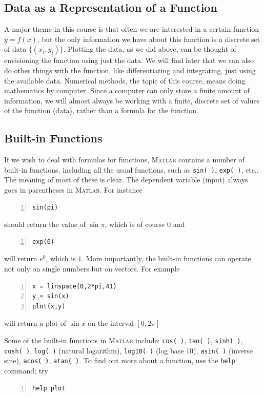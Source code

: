 
\subsection*{Data as a Representation of a Function}

A major theme in this course is that often we are interested
in a certain function $y = f(x)$, but the only
information we have about this function is a discrete set of data
$\{(x_i,y_i)\}$. Plotting the data, as we did above, can be thought of
envisioning the function using just the data. We will find later
that we can also do other things with the function, like
differentiating and integrating, just using
the available data. Numerical methods, the topic of this course,
means doing mathematics by computer. Since a computer can only store
a finite  amount of information, we will almost always be working
with a finite, discrete set of values of the function (data), rather
than a formula for the function.


\subsection*{Built-in Functions}

If we wish to deal with formulas for functions, \textsc{Matlab} contains a
number of built-in functions, including all
the usual functions, such as \verb^sin( )^, \verb^exp( )^, etc.. The meaning
of most of these is clear. The dependent variable (input) always goes
in parentheses in \textsc{Matlab}. For instance
\begin{lstlisting}[frame=none,numbers=left]
sin(pi)
\end{lstlisting}
should return the value of $\sin \pi$, which is of course $0$ and
\begin{lstlisting}[frame=none,numbers=left]
exp(0)
\end{lstlisting}
will return $e^0$, which is $1$.
More importantly, the built-in functions  can operate
not only on single numbers but on vectors. For example
\begin{lstlisting}[frame=none,numbers=left]
x = linspace(0,2*pi,41)
y = sin(x)
plot(x,y)
\end{lstlisting}
will return a plot of $\sin x$ on the interval $[0,2 \pi]$

Some of the built-in functions in \textsc{Matlab} include:
\verb^cos( )^, \verb^tan( )^, \verb^sinh( )^, \verb^cosh( )^,
\verb^log( )^ (natural logarithm), \verb^log10( )^
(log base 10), \verb^asin( )^ (inverse sine), \verb^acos( )^, \verb^atan( )^.
To find out more about a function, use the \verb&help& command; try
\begin{lstlisting}[frame=none,numbers=left]
help plot
\end{lstlisting}

